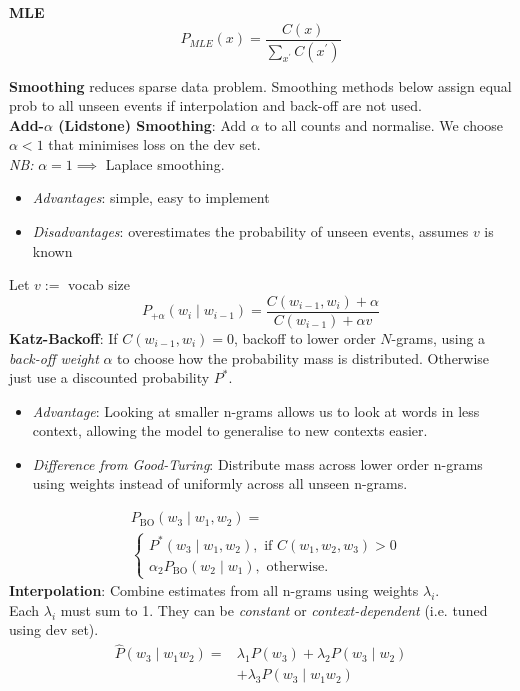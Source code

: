 \documentclass[8pt]{extarticle} %
\begin{document}
\begin{multicols*}{3}
\textbf{MLE}$$P_{M L E}(x)=\frac{C(x)}{\sum_{x^{\prime}} C\left(x^{\prime}\right)}$$

\textbf{Smoothing} reduces sparse data problem. Smoothing methods below assign equal prob to all unseen events if interpolation and back-off are not used.\\

\textbf{Add-$\alpha$ (Lidstone) Smoothing}: Add $\alpha$ to all counts and normalise. 
We choose $\alpha<1$ that minimises loss on the dev set. \\
\textit{NB:} $\alpha = 1 \implies$ Laplace smoothing.
\begin{itemize}[label=\textbullet, labelsep=0.3em, leftmargin=0.5em, itemsep=0em]
    \item \textit{Advantages}: simple, easy to implement
    \item \textit{Disadvantages}: overestimates the probability of unseen events, assumes $v$ is known
\end{itemize}
Let $v:=$ vocab size
$$
P_{+\alpha}\left(w_i \mid w_{i-1}\right)=\frac{C\left(w_{i-1}, w_i\right)+\alpha}{C\left(w_{i-1}\right)+\alpha v}
$$
\textbf{Katz-Backoff}: 
If $C(w_{i-1}, w_i)=0$, backoff to lower order $N$-grams, using a \textit{back-off weight} $\alpha$ to choose how the probability mass is distributed. Otherwise just use a discounted probability $P^*$.
\begin{itemize}[label=\textbullet, labelsep=0.3em, leftmargin=0.5em, itemsep=0em]
\item \textit{Advantage}: Looking at smaller n-grams allows us to look at words in less context, allowing the model to generalise to new contexts easier. 
\item \textit{Difference from Good-Turing}: Distribute mass across lower order n-grams using weights instead of uniformly across all unseen n-grams. 
\end{itemize}
\begin{align*}
   &P_{\mathrm{BO}}\left(w_3 \mid w_{1}, w_2 \right)= \\
    &\begin{cases}P^*\left(w_3 \mid w_{1}, w_2 \right), \text { if } C\left(w_{1}, w_2, w_3\right)>0 \\ \alpha_{2} P_{\mathrm{BO}}\left(w_2 \mid w_1\right), \text { otherwise. }\end{cases}
\end{align*}
\textbf{Interpolation}: Combine estimates from all n-grams using weights $\lambda_i$.\\
Each $\lambda_i$ must sum to 1. They can be \textit{constant} or \textit{context-dependent} (i.e. tuned using dev set).
$$\begin{aligned} \hat{P}\left(w_3 \mid w_{1} w_{2}\right)= & \lambda_1 P\left(w_3\right) +\lambda_2 P\left(w_3 \mid w_{2}\right) \\ & +\lambda_3 P\left(w_3 \mid w_{1} w_{2}\right)\end{aligned}$$


\end{multicols*}
\end{document}
